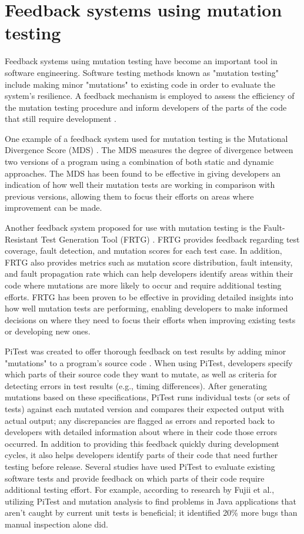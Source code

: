 \section{Feedback systems using mutation testing}
Feedback systems using mutation testing have become an important tool in software engineering. Software testing methods known as "mutation testing" include making minor "mutations" to existing code in order to evaluate the system's resilience. A feedback mechanism is employed to assess the efficiency of the mutation testing procedure and inform developers of the parts of the code that still require development \cite{ref43}.\par 
One example of a feedback system used for mutation testing is the Mutational Divergence Score (MDS) \cite{ref44}. The MDS measures the degree of divergence between two versions of a program using a combination of both static and dynamic approaches. The MDS has been found to be effective in giving developers an indication of how well their mutation tests are working in comparison with previous versions, allowing them to focus their efforts on areas where improvement can be made.\par 
Another feedback system proposed for use with mutation testing is the Fault-Resistant Test Generation Tool (FRTG) \cite{ref45}. FRTG provides feedback regarding test coverage, fault detection, and mutation scores for each test case. In addition, FRTG also provides metrics such as mutation score distribution, fault intensity, and fault propagation rate which can help developers identify areas within their code where mutations are more likely to occur and require additional testing efforts. FRTG has been proven to be effective in providing detailed insights into how well mutation tests are performing, enabling developers to make informed decisions on where they need to focus their efforts when improving existing tests or developing new ones.\par 
PiTest was created to offer thorough feedback on test results by adding minor "mutations" to a program's source code \cite{ref46}. When using PiTest, developers specify which parts of their source code they want to mutate, as well as criteria for detecting errors in test results (e.g., timing differences). After generating mutations based on these specifications, PiTest runs individual tests (or sets of tests) against each mutated version and compares their expected output with actual output; any discrepancies are flagged as errors and reported back to developers with detailed information about where in their code those errors occurred. In addition to providing this feedback quickly during development cycles, it also helps developers identify parts of their code that need further testing before release. Several studies have used PiTest to evaluate existing software tests and provide feedback on which parts of their code require additional testing effort. For example, according to research by Fujii et al., utilizing PiTest and mutation analysis to find problems in Java applications that aren't caught by current unit tests is beneficial; it identified 20\% more bugs than manual inspection alone did.\par 
